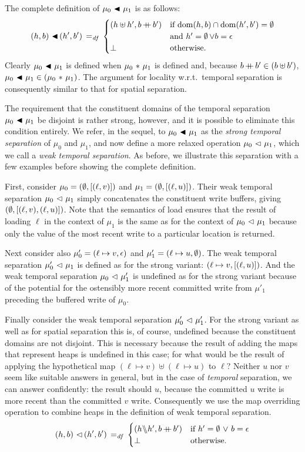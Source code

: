 \documentclass[11pt]{report}
\begin{document}
The complete definition of $\mu_0 \operatorname{\,\blacktriangleleft\,} \mu_1$ is as follows: \[ (h,b) \operatorname{\,\blacktriangleleft\,} (h',b') \operatorname{\;=_{\mathit{df}}\;} \begin{cases}
  (h \uplus h', b \operatorname{+\!\!\!+} b') & \text{if $\operatorname{\mathrm{dom}}(h,b) \cap \operatorname{\mathrm{dom}}(h',b') = \operatorname{\emptyset}$} \\ & \text{and $h' = \operatorname{\emptyset} \vee b = \epsilon$} \\
  \bot & \text{otherwise.}
\end{cases}\] Clearly $\mu_0 \operatorname{\,\blacktriangleleft\,} \mu_1$ is defined when $\mu_0 \operatorname{\,\ast\,} \mu_1$ is defined and, because $b \operatorname{+\!\!\!+} b' \in (b \uplus b')$, $\mu_0 \operatorname{\,\blacktriangleleft\,} \mu_1 \in (\mu_0 \operatorname{\,\ast\,} \mu_1)$. The argument for locality w.r.t.\ temporal separation is consequently similar to that for spatial separation. 

The requirement that the constituent domains of the temporal separation $\mu_0 \operatorname{\,\blacktriangleleft\,} \mu_1$ be disjoint is rather strong, however, and it is possible to eliminate this condition entirely. We refer, in the sequel, to  $\mu_0 \operatorname{\,\blacktriangleleft\,} \mu_1$ as the \emph{strong temporal separation} of $\mu_0$ and $\mu_1$, and now define a more relaxed operation $\mu_0 \operatorname{\,\vartriangleleft\,} \mu_1$, which we call a \emph{weak temporal separation}. As before, we illustrate this separation with a few examples before showing the complete definition. 

First, consider $\mu_0 = (\operatorname{\emptyset},\left[(\ell,v)\right])$ and $\mu_1 = (\operatorname{\emptyset},\left[(\ell,u)\right])$. Their weak temporal separation $\mu_0 \operatorname{\,\vartriangleleft\,} \mu_1$ simply concatenates the constituent write buffers, giving $(\operatorname{\emptyset},\left[(\ell,v),(\ell,u)\right])$. Note that the semantics of load ensures that the result of loading $\ell$ in the context of $\mu_1$ is the same as for the context of $\mu_0 \operatorname{\,\vartriangleleft\,} \mu_1$ because only the value of the most recent write to a particular location is returned. 

Next consider also $\mu'_0 = (\ell \mapsto v,\epsilon)$ and $\mu'_1 = (\ell \mapsto u, \operatorname{\emptyset})$. The weak temporal separation $\mu'_0 \operatorname{\,\vartriangleleft\,} \mu_1$ is defined as for the strong variant: $(\ell \mapsto v, \left[(\ell,u)\right])$. And the weak temporal separation $\mu_0 \operatorname{\,\vartriangleleft\,} \mu'_1$ is undefined as for the strong variant because of the potential for the ostensibly more recent committed write from $\mu'_1$ preceding the buffered write of $\mu_0$. 

Finally consider the weak temporal separation $\mu'_0 \operatorname{\,\vartriangleleft\,} \mu'_1$. For the strong variant as well as for spatial separation this is, of course, undefined because the constituent domains are not disjoint. This is necessary because the result of adding the maps that represent heaps is  undefined in this case; for what would be the result of applying the hypothetical map $(\ell \mapsto v) \uplus (\ell \mapsto u)$ to $\ell$? Neither $u$ nor $v$ seem like suitable answers in general, but in the case of \emph{temporal} separation, we can answer confidently: the result should $u$, because the committed $u$ write is more recent than the committed $v$ write. Consequently we use the map overriding operation to combine heaps in the definition of weak temporal separation. 
\[ (h,b) \operatorname{\,\vartriangleleft\,} (h',b') \operatorname{\;=_{\mathit{df}}\;} \begin{cases}
(h \backslash\!\!\backslash h', b \operatorname{+\!\!\!+} b') & \text{if $h' = \operatorname{\emptyset} \operatorname{\,\vee\,} b = \epsilon$} \\
\bot & \text{otherwise.}
\end{cases}\]
\end{document}
